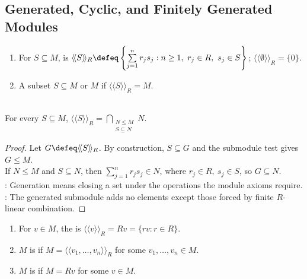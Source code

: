 \subsection{Generated, Cyclic, and Finitely Generated Modules}

\begin{definition} \label{def:generated-submodule} 
\begin{enumerate}[label=(\roman*)]
\setlength{\itemsep}{0pt}
\item For $S\subseteq M$,  is $\langle\!\langle S\rangle\!\rangle_R \defeq \left\{\sum\limits_{j=1}^{n} r_js_j:n\geq1,\ r_j\in R,\ s_j\in S\right\}$; $\langle\!\langle\emptyset\rangle\!\rangle_R=\{0\}$.
\item A subset $S\subseteq M$  or  $M$ if $\langle\!\langle S\rangle\!\rangle_R=M$.
\end{enumerate}
\end{definition}

\begin{proposition} \label{prop:generated-submodule-smallest} \\
For every $S\subseteq M$, $\langle\!\langle S\rangle\!\rangle_R = \bigcap\limits_{\substack{N\leq M\\ S\subseteq N}}N$.
\begin{proof}
Let $G\defeq\langle\!\langle S\rangle\!\rangle_R$. By construction, $S\subseteq G$ and the submodule test gives $G\leq M$.\\
If $N\leq M$ and $S\subseteq N$, then $\sum\limits_{j=1}^{n}r_js_j\in N$, where $r_j\in R,\ s_j\in S$, so $G\subseteq N$.\\
: Generation means closing a set under the operations the module axioms require.\\
: The generated submodule adds no elements except those forced by finite $R$-linear combination.
\end{proof}
\end{proposition}

\begin{definition} \label{def:cyclic-and-finitely-generated-modules} 
\begin{enumerate}[label=(\roman*)]
\setlength{\itemsep}{0pt}
\item For $v\in M$, the  is $\langle\!\langle v\rangle\!\rangle_R=Rv=\{rv:r\in R\}$.
\item $M$ is  if $M=\langle\!\langle v_1,\ldots,v_n\rangle\!\rangle_R$ for some $v_1,\ldots,v_n\in M$.
\item $M$ is  if $M=Rv$ for some $v\in M$.
\end{enumerate}
\end{definition}

